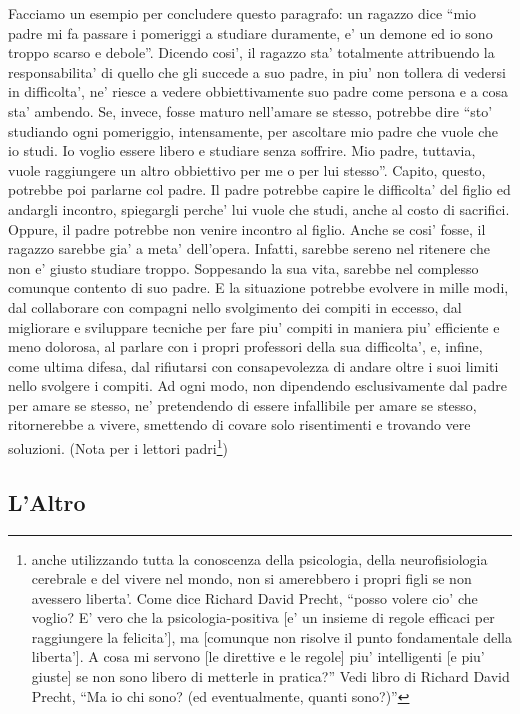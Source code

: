 Facciamo un esempio per concludere questo paragrafo: un ragazzo dice ``mio padre mi fa passare i pomeriggi a studiare duramente, e' un demone ed io sono troppo scarso e debole''. Dicendo cosi', il ragazzo sta' totalmente attribuendo la responsabilita' di quello che gli succede a suo padre, in piu' non tollera di vedersi in difficolta', ne' riesce a vedere obbiettivamente suo padre come persona e a cosa sta' ambendo. Se, invece, fosse maturo nell'amare se stesso, potrebbe dire ``sto' studiando ogni pomeriggio, intensamente, per ascoltare mio padre che vuole che io studi. Io voglio essere libero e studiare senza soffrire. Mio padre, tuttavia, vuole raggiungere un altro obbiettivo per me o per lui stesso''.  Capito, questo, potrebbe poi parlarne col padre. Il padre potrebbe capire le difficolta' del figlio ed andargli incontro, spiegargli perche' lui vuole che studi, anche al costo di sacrifici. Oppure, il padre potrebbe non venire incontro al figlio. Anche se cosi' fosse, il ragazzo sarebbe gia' a meta' dell'opera. Infatti, sarebbe sereno nel ritenere che non e' giusto studiare troppo. Soppesando la sua vita, sarebbe nel complesso comunque contento di suo padre. E la situazione potrebbe evolvere in mille modi, dal collaborare con compagni nello svolgimento dei compiti in eccesso,  dal migliorare e sviluppare tecniche per fare piu' compiti in maniera piu' efficiente e meno dolorosa, al parlare con i propri professori della sua difficolta', e, infine, come ultima difesa, dal rifiutarsi con consapevolezza di andare oltre i suoi limiti nello svolgere i compiti. Ad ogni modo, non dipendendo esclusivamente dal padre per amare se stesso, ne' pretendendo di essere infallibile per amare se stesso, ritornerebbe a vivere, smettendo di covare solo risentimenti e trovando vere soluzioni. (Nota per i lettori padri\footnote{anche utilizzando tutta la conoscenza della psicologia, della neurofisiologia cerebrale e del vivere nel mondo, non si amerebbero i propri figli se non avessero liberta'. Come dice Richard David Precht, ``posso volere cio' che voglio? E' vero che la psicologia-positiva [e' un insieme di regole efficaci per raggiungere la felicita'], ma [comunque non risolve il punto fondamentale della liberta']. A cosa mi servono [le direttive e le regole] piu' intelligenti [e piu' giuste] se non sono libero di metterle in pratica?'' Vedi libro di Richard David Precht, ``Ma io chi sono? (ed eventualmente, quanti sono?)''})

\subsection{L'Altro}
\label{altrui}

